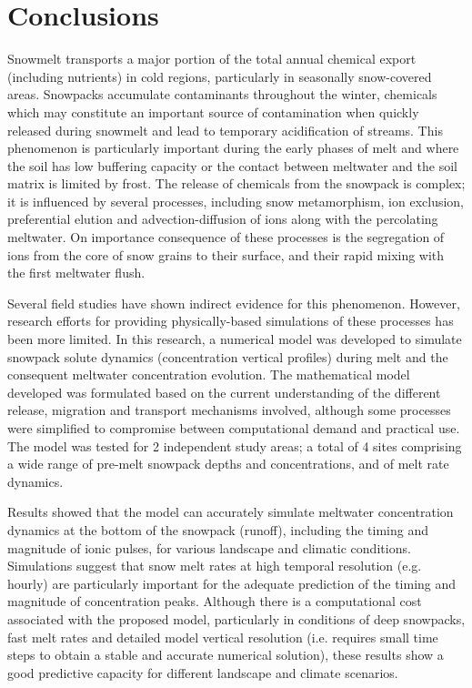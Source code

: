 \documentclass[authoryear,preprint,review,12pt]{elsarticle}
\begin{document}
\section{Conclusions}
\label{chapter:conclusions}

Snowmelt transports a major portion of the total annual chemical export (including nutrients) in cold regions, particularly in seasonally snow-covered areas. Snowpacks accumulate contaminants throughout the winter, chemicals which may constitute an important source of contamination when quickly released during snowmelt and lead to temporary acidification of streams. This phenomenon is particularly important during the early phases of melt and where the soil has low buffering capacity or the contact between meltwater and the soil matrix is limited by frost. The release of chemicals from the snowpack is complex; it is influenced by several processes, including snow metamorphism, ion exclusion, preferential elution and advection-diffusion of ions along with the percolating meltwater. On importance consequence of these processes is the segregation of ions from the core of snow grains to their surface, and their rapid mixing with the first meltwater flush. \par

Several field studies have shown indirect evidence for this phenomenon. However, research efforts for providing physically-based simulations of these processes has been more limited. In this research, a numerical model was developed to simulate snowpack solute dynamics (concentration vertical profiles) during melt and the consequent meltwater concentration evolution. The mathematical model developed was formulated based on the current understanding of the different release, migration and transport mechanisms involved, although some processes were simplified to compromise between computational demand and practical use. The model was tested for 2 independent study areas; a total of 4 sites comprising a wide range of pre-melt snowpack depths and concentrations, and of melt rate dynamics. \par
 
Results showed that the model can accurately simulate meltwater concentration dynamics at the bottom of the snowpack (runoff), including the timing and magnitude of ionic pulses, for various landscape and climatic conditions. Simulations suggest that snow melt rates at high temporal resolution (e.g. hourly) are particularly important for the adequate prediction of the timing and magnitude of concentration peaks. Although there is a computational cost associated with the proposed model, particularly in conditions of deep snowpacks, fast melt rates and detailed model vertical resolution (i.e. requires small time steps to obtain a stable and accurate numerical solution), these results show a good predictive capacity for different landscape and climate scenarios. \par
\end{document}
